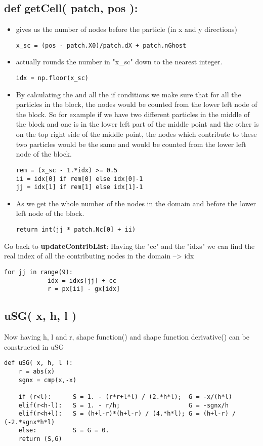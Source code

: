 \documentclass[11pt,fleqn]{book} %
\begin{document}
\subsection{def getCell( patch, pos ):}
\begin{itemize}
\item {} gives us the number of nodes before the particle (in x and y directions)
\begin{lstlisting}
x_sc = (pos - patch.X0)/patch.dX + patch.nGhost
\end{lstlisting}
\item {} actually rounds the number in "x\_sc" down to the nearest integer.
\begin{lstlisting}
idx = np.floor(x_sc)
\end{lstlisting}
\item By calculating the  and all the if conditions we make sure that for all the particles in the block, the nodes would be counted from the lower left node of the block. So for example if we have two different particles in the middle of the block and one is in the lower left part of the middle point and the other is on the top right side of the middle point, the nodes which contribute to these two particles would be the same and would be counted from the lower left node of the block.
\begin{lstlisting}
rem = (x_sc - 1.*idx) >= 0.5
ii = idx[0] if rem[0] else idx[0]-1
jj = idx[1] if rem[1] else idx[1]-1
\end{lstlisting}

\item As  we get the whole number of the nodes in the domain and before the lower left node of the block.
\begin{lstlisting}
return int(jj * patch.Nc[0] + ii)
\end{lstlisting}
\end{itemize}
Go back to \textbf{updateContribList}:
Having the "cc" and the "idxs" we can find the real index of all the contributing nodes in the domain --> idx
\begin{lstlisting}
for jj in range(9):	
            idx = idxs[jj] + cc 
            r = px[ii] - gx[idx]
\end{lstlisting}
\subsection{uSG( x, h, l )}
Now having h, l and r, shape function() and shape function derivative() can be constructed in uSG 
\begin{lstlisting}
def uSG( x, h, l ):
    r = abs(x)
    sgnx = cmp(x,-x)
	
    if (r<l):      S = 1. - (r*r+l*l) / (2.*h*l);  G = -x/(h*l)
    elif(r<h-l):   S = 1. - r/h;                   G = -sgnx/h
    elif(r<h+l):   S = (h+l-r)*(h+l-r) / (4.*h*l); G = (h+l-r) / (-2.*sgnx*h*l)
    else:          S = G = 0.
    return (S,G)
\end{lstlisting}
\end{document}
